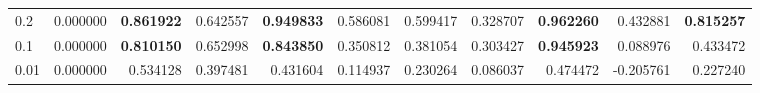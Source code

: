 \begin{tabular}{lrrrrrrrrrr}
0.2 & 0.000000 & \color{f_darkred} \bfseries 0.861922 & 0.642557 & \color{f_darkred} \bfseries 0.949833 & 0.586081 & 0.599417 & 0.328707 & \color{f_darkred} \bfseries 0.962260 & 0.432881 & \color{f_darkred} \bfseries 0.815257 \\
0.1 & 0.000000 & \color{f_darkred} \bfseries 0.810150 & 0.652998 & \color{f_darkred} \bfseries 0.843850 & 0.350812 & 0.381054 & 0.303427 & \color{f_darkred} \bfseries 0.945923 & 0.088976 & 0.433472 \\
0.01 & 0.000000 & 0.534128 & 0.397481 & 0.431604 & 0.114937 & 0.230264 & 0.086037 & 0.474472 & -0.205761 & 0.227240 \\
\bottomrule
\end{tabular}
